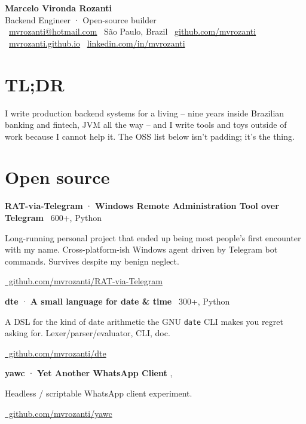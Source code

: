 \documentclass[10pt,a4paper]{article}
\newcommand{\role}[4]{\noindent\textbf{\large #1} \textcolor{accent}{·} \textbf{#2} \hfill \textcolor{muted}{#3, #4}\par\vspace{2pt}}
\begin{document}
\pagestyle{empty}

\begin{center}
{\Huge\bfseries\color{heading} Marcelo Vironda Rozanti}\\[2pt]
{\large\color{accent} Backend Engineer · Open-source builder}\\[4pt]
\small
\faEnvelope\ \href{mailto:mvrozanti@hotmail.com}{mvrozanti@hotmail.com} \quad
\faMapMarker*\ São Paulo, Brazil \quad
\faGithub\ \href{https://github.com/mvrozanti}{github.com/mvrozanti} \quad
\faGlobe\ \href{https://mvrozanti.github.io}{mvrozanti.github.io} \quad
\faLinkedin\ \href{https://linkedin.com/in/mvrozanti}{linkedin.com/in/mvrozanti}
\end{center}

\section{TL;DR}
I write production backend systems for a living -- nine years inside Brazilian banking and fintech, JVM all the way -- and I write tools and toys outside of work because I cannot help it. The OSS list below isn't padding; it's the thing.

\section{Open source}
\role{RAT-via-Telegram}{Windows Remote Administration Tool over Telegram}{\faStar\ 600+}{Python}
Long-running personal project that ended up being most people's first encounter with my name. Cross-platform-ish Windows agent driven by Telegram bot commands. Survives despite my benign neglect.\par\vspace{3pt}
\href{https://github.com/mvrozanti/RAT-via-Telegram}{\small\faGithub\ github.com/mvrozanti/RAT-via-Telegram}\par\vspace{6pt}

\role{dte}{A small language for date \& time}{\faStar\ 300+}{Python}
A DSL for the kind of date arithmetic the GNU \texttt{date} CLI makes you regret asking for. Lexer/parser/evaluator, CLI, doc.\par\vspace{3pt}
\href{https://github.com/mvrozanti/dte}{\small\faGithub\ github.com/mvrozanti/dte}\par\vspace{6pt}

\role{yawc}{Yet Another WhatsApp Client}{}{}
Headless / scriptable WhatsApp client experiment.\par\vspace{3pt}
\href{https://github.com/mvrozanti/yawc}{\small\faGithub\ github.com/mvrozanti/yawc}\par\vspace{6pt}
\end{document}
